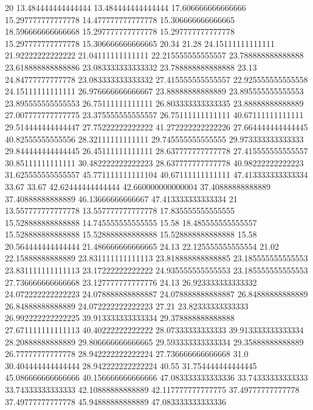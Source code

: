 20 13.484444444444444 13.484444444444444 17.606666666666666 15.297777777777778 14.477777777777778 15.306666666666665 18.596666666666668 15.297777777777778 15.297777777777778 15.297777777777778 15.306666666666665 20.34 21.28 24.15111111111111 21.92222222222222 21.04111111111111 22.215555555555557 23.788888888888888 23.618888888888886 23.083333333333332 23.788888888888888 23.13 24.84777777777778 23.083333333333332 27.415555555555557 22.925555555555558 24.15111111111111 26.976666666666667 23.88888888888889 23.895555555555553 23.895555555555553 26.75111111111111 26.803333333333335 23.88888888888889 27.007777777777775 23.375555555555557 26.75111111111111 40.67111111111111 29.514444444444447 27.75222222222222 41.272222222222226 27.664444444444445 40.82555555555556 28.32111111111111 29.745555555555555 29.973333333333333 29.844444444444445 26.45111111111111 28.637777777777778 27.415555555555557 30.85111111111111 30.482222222222223 28.637777777777778 40.98222222222223 31.625555555555557 45.771111111111104 40.67111111111111 47.413333333333334 33.67 33.67 42.62444444444444 42.660000000000004 37.40888888888889 37.40888888888889 46.13666666666667 47.413333333333334
21 13.557777777777778 13.557777777777778 17.835555555555555 15.528888888888888 14.745555555555555 15.58 18.485555555555557 15.528888888888888 15.528888888888888 15.528888888888888 15.58 20.564444444444444 21.486666666666665 24.13 22.125555555555554 21.02 22.15888888888889 23.831111111111113 23.818888888888885 23.185555555555553 23.831111111111113 23.17222222222222 24.935555555555553 23.185555555555553 27.736666666666668 23.127777777777776 24.13 26.923333333333332 24.072222222222223 24.078888888888887 24.078888888888887 26.84888888888889 26.84888888888889 24.072222222222223 27.21 23.82333333333333 26.992222222222225 39.913333333333334 29.378888888888888 27.671111111111113 40.40222222222222 28.07333333333333 39.913333333333334 28.20888888888889 29.806666666666665 29.593333333333334 29.35888888888889 26.77777777777778 28.942222222222224 27.736666666666668 31.0 30.404444444444444 28.942222222222224 40.55 31.754444444444445 45.086666666666666 40.156666666666666 47.083333333333336 33.74333333333333 33.74333333333333 42.10888888888889 42.117777777777775 37.49777777777778 37.49777777777778 45.94888888888889 47.083333333333336
